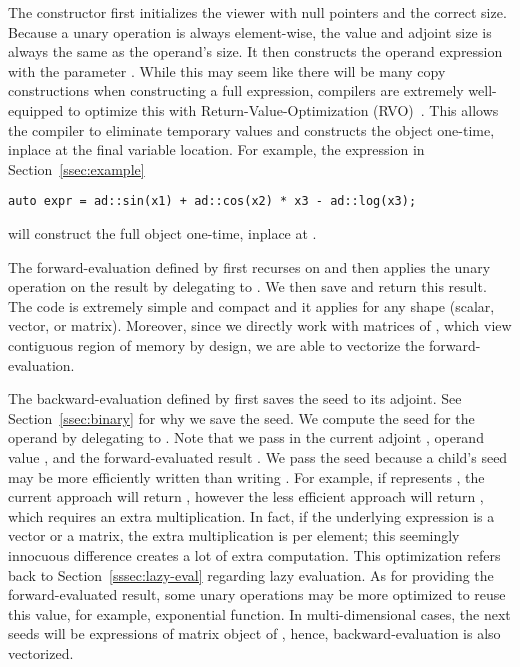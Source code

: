 The constructor first initializes the viewer with null pointers and the correct size.
Because a unary operation is always element-wise,
the value and adjoint size is always the same as the operand's size.
It then constructs the operand expression with the parameter .
While this may seem like there will be many copy constructions when constructing a full expression,
compilers are extremely well-equipped to optimize this with 
Return-Value-Optimization (RVO)~\cite{meyers:1995}.
This allows the compiler to eliminate temporary values and constructs the object 
one-time, inplace at the final variable location.
For example, the expression in Section~\ref{ssec:example}
\begin{lstlisting}[style=customcpp]
    auto expr = ad::sin(x1) + ad::cos(x2) * x3 - ad::log(x3);
\end{lstlisting}
will construct the full object one-time, inplace at .

The forward-evaluation defined by  first
recurses on  and then applies the unary operation
on the result by delegating to .
We then save and return this result.
The code is extremely simple and compact and it applies for any shape (scalar, vector, or matrix).
Moreover, since we directly work with  matrices of , 
which view contiguous region of memory by design,
we are able to vectorize the forward-evaluation.

The backward-evaluation defined by  first saves the seed to its adjoint.
See Section~\ref{ssec:binary} for why we save the seed.
We compute the seed for the operand by delegating to .
Note that we pass in the current adjoint , 
operand value , and 
the forward-evaluated result .
We pass the seed because a child's seed may be more efficiently written 
than writing .
For example, if  represents ,
the current approach will return , however
the less efficient approach will return ,
which requires an extra multiplication.
In fact, if the underlying expression is a vector or a matrix,
the extra multiplication is per element;
this seemingly innocuous difference creates a lot of extra computation.
This optimization refers back to Section~\ref{sssec:lazy-eval} regarding lazy evaluation.
As for providing the forward-evaluated result, 
some unary operations may be more optimized to reuse this value,
for example, exponential function.
In multi-dimensional cases, the next seeds will be  expressions
of matrix object of , hence, backward-evaluation is also vectorized.

